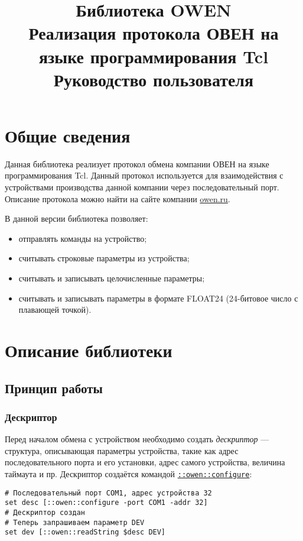 \documentclass[12pt, a4paper]{article}
\title{Библиотека OWEN \\ Реализация протокола ОВЕН на языке программирования Tcl \\ Руководство пользователя}
\newcommand{\CMD}[1]{{\tt \hyperref[#1]{#1}}}
\begin{document}
\maketitle

\section{Общие сведения}

Данная библиотека реализует протокол обмена компании ОВЕН на языке программирования Tcl. Данный протокол используется для взаимодействия с устройствами производства данной компании через последовательный порт. Описание протокола можно найти на сайте компании \href{http://owen.ru}{owen.ru}. 

В данной версии библиотека позволяет:

\begin{itemize}
\item отправлять команды на устройство;
\item считывать строковые параметры из устройства;
\item считывать и записывать целочисленные параметры;
\item считывать и записывать параметры в формате FLOAT24 (24-битовое число с плавающей точкой).
\end{itemize}

\section{Описание библиотеки}

\subsection{Принцип работы}

\subsubsection{Дескриптор}

Перед началом обмена с устройством необходимо создать {\it дескриптор} --- структура, описывающая параметры устройства, такие как адрес последовательного порта и его установки, адрес самого устройства, величина таймаута и пр. Дескриптор создаётся командой \CMD{::owen::configure}:

\begin{verbatim} 
# Последовательный порт COM1, адрес устройства 32
set desc [::owen::configure -port COM1 -addr 32]
# Дескриптор создан
# Теперь запрашиваем параметр DEV
set dev [::owen::readString $desc DEV]
\end{verbatim} 
\end{document}
